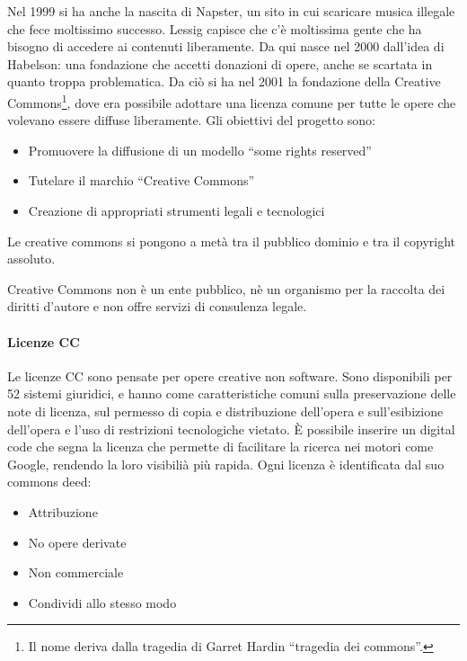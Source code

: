 Nel 1999 si ha anche la nascita di Napster, un sito in cui scaricare musica illegale che fece moltissimo successo. Lessig capisce che c'\`e moltissima gente che ha bisogno di accedere ai contenuti liberamente. Da qui nasce nel 2000 dall'idea di Habelson: una fondazione che accetti donazioni di opere, anche se scartata in quanto troppa problematica. Da ci\`o si ha nel 2001 la fondazione della Creative Commons\footnote{Il nome deriva dalla tragedia di Garret Hardin ``tragedia dei commons''.}, dove era possibile adottare una licenza comune per tutte le opere che volevano essere diffuse liberamente. Gli obiettivi del progetto sono:
\begin{itemize}

\item Promuovere la diffusione di un modello ``some rights reserved''
\item Tutelare il marchio ``Creative Commons''
\item Creazione di  appropriati strumenti legali e tecnologici

\end{itemize}
Le creative commons si pongono a met\`a tra il pubblico dominio e tra il copyright assoluto.

Creative Commons non \`e un ente pubblico, n\`e un organismo per la raccolta dei diritti d'autore e non offre servizi di consulenza legale.

\paragraph*{Licenze CC}Le licenze CC sono pensate per opere creative non software. Sono disponibili per 52 sistemi giuridici, e hanno come caratteristiche comuni sulla preservazione delle note di licenza, sul permesso di copia e distribuzione dell'opera e sull'esibizione dell'opera e l'uso di restrizioni tecnologiche vietato.
\`E possibile inserire un digital code che segna la licenza che permette di facilitare la ricerca nei motori come Google, rendendo la loro visibili\`a pi\`u rapida. Ogni licenza \`e identificata dal suo commons deed:
\begin{itemize}
  
\item Attribuzione
\item No opere derivate
\item Non commerciale
\item Condividi allo stesso modo

\end{itemize}

